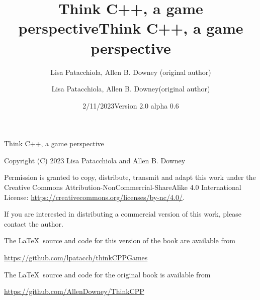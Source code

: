 \documentclass{book}
\title{Think C++, a game perspective}
\author{Lisa Patacchiola, Allen B. Downey (original author)}
\date{2/11/2023}
\begin{document}
\title {Think C++, a game perspective}
\author {Lisa Patacchiola, Allen B. Downey(original author)}
\date {Version 2.0 alpha 0.6}
\maketitle

\vspace{2in}
\begin{center}
{\Large Think C++, a game perspective}

\vspace{0.25in}

Copyright (C) 2023 Lisa Patacchiola and Allen B. Downey
\end{center}
\vspace{0.25in}

Permission is granted to copy, distribute, transmit and adapt this
work under the Creative Commons Attribution-NonCommercial-ShareAlike 4.0
International License: \url{https://creativecommons.org/licenses/by-nc/4.0/}.

If you are interested in distributing a commercial version of this
work, please contact the author.

\bigskip
The \LaTeX\ source and code for this version of the book are available from

\bigskip
\url{https://github.com/lpatacch/thinkCPPGames}

\bigskip
The \LaTeX\ source and code for the original book is available from

\bigskip
\url{https://github.com/AllenDowney/ThinkCPP}



\frontmatter

\tableofcontents

\mainmatter







\appendix


\printindex
\end{document}
